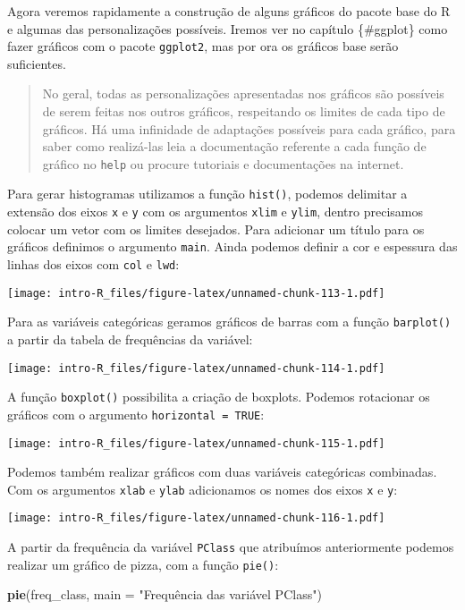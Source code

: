 \documentclass[]{book}
\newenvironment{Shaded}{\begin{snugshade}}{\end{snugshade}}
\newcommand{\DataTypeTok}[1]{\textcolor[rgb]{0.13,0.29,0.53}{#1}}
\newcommand{\KeywordTok}[1]{\textcolor[rgb]{0.13,0.29,0.53}{\textbf{#1}}}
\newcommand{\NormalTok}[1]{#1}
\newcommand{\StringTok}[1]{\textcolor[rgb]{0.31,0.60,0.02}{#1}}
\theoremstyle{definition}
\theoremstyle{definition}
\theoremstyle{definition}
\theoremstyle{remark}
\begin{document}
Agora veremos rapidamente a construção de alguns gráficos do pacote base do R e algumas das personalizações possíveis. Iremos ver no capítulo \{\#ggplot\} como fazer gráficos com o pacote \texttt{ggplot2}, mas por ora os gráficos base serão suficientes.

\begin{quote}
No geral, todas as personalizações apresentadas nos gráficos são possíveis de serem feitas nos outros gráficos, respeitando os limites de cada tipo de gráficos. Há uma infinidade de adaptações possíveis para cada gráfico, para saber como realizá-las leia a documentação referente a cada função de gráfico no \texttt{help} ou procure tutoriais e documentações na internet.
\end{quote}

Para gerar histogramas utilizamos a função \texttt{hist()}, podemos delimitar a extensão dos eixos \texttt{x} e \texttt{y} com os argumentos \texttt{xlim} e \texttt{ylim}, dentro precisamos colocar um vetor com os limites desejados. Para adicionar um título para os gráficos definimos o argumento \texttt{main}. Ainda podemos definir a cor e espessura das linhas dos eixos com \texttt{col} e \texttt{lwd}:

\texttt{[image: intro-R\_files/figure-latex/unnamed-chunk-113-1.pdf]}

Para as variáveis categóricas geramos gráficos de barras com a função \texttt{barplot()} a partir da tabela de frequências da variável:

\texttt{[image: intro-R\_files/figure-latex/unnamed-chunk-114-1.pdf]}

A função \texttt{boxplot()} possibilita a criação de boxplots. Podemos rotacionar os gráficos com o argumento \texttt{horizontal\ =\ TRUE}:

\texttt{[image: intro-R\_files/figure-latex/unnamed-chunk-115-1.pdf]}

Podemos também realizar gráficos com duas variáveis categóricas combinadas. Com os argumentos \texttt{xlab} e \texttt{ylab} adicionamos os nomes dos eixos \texttt{x} e \texttt{y}:

\texttt{[image: intro-R\_files/figure-latex/unnamed-chunk-116-1.pdf]}

A partir da frequência da variável \texttt{PClass} que atribuímos anteriormente podemos realizar um gráfico de pizza, com a função \texttt{pie()}:

\begin{Shaded}
\begin{Highlighting}[]
\KeywordTok{pie}\NormalTok{(freq_class, }\DataTypeTok{main =} \StringTok{"Frequência das variável PClass"}\NormalTok{)}
\end{Highlighting}
\end{Shaded}
\end{document}
